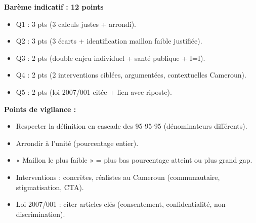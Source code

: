 \documentclass[11pt]{article}
\begin{document}
\begin{corrige}
\textbf{Barème indicatif : 12 points}
\begin{itemize}
\item Q1 : 3 pts (3 calculs justes + arrondi).
\item Q2 : 3 pts (3 écarts + identification maillon faible justifiée).
\item Q3 : 2 pts (double enjeu individuel + santé publique + I=I).
\item Q4 : 2 pts (2 interventions ciblées, argumentées, contextuelles Cameroun).
\item Q5 : 2 pts (loi 2007/001 citée + lien avec riposte).
\end{itemize}

\textbf{Points de vigilance :}
\begin{itemize}
\item Respecter la définition en cascade des 95-95-95 (dénominateurs différents).
\item Arrondir à l'unité (pourcentage entier).
\item « Maillon le plus faible » = plus bas pourcentage atteint ou plus grand gap.
\item Interventions : concrètes, réalistes au Cameroun (communautaire, stigmatisation, CTA).
\item Loi 2007/001 : citer articles clés (consentement, confidentialité, non-discrimination).
\end{itemize}


\end{corrige}
\end{document}
